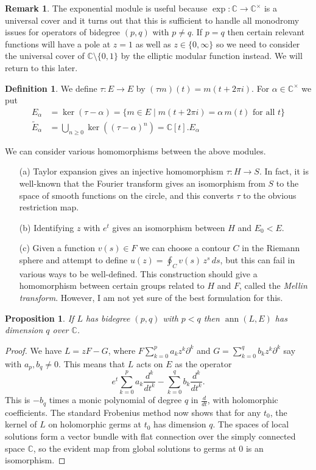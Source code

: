 \documentclass{amsart}
\newcommand{\ann}       {\operatorname{ann}}
\newcommand{\C}         {{\mathbb{C}}}
\newcommand{\al}        {\alpha}
\newcommand{\sm}        {\setminus}
\newcommand{\st}        {\;|\;}
\newcommand{\tE}	{\widetilde{E}}
\newcommand{\tm}        {\times}
\renewcommand{\:}{\colon}
\newtheorem{proposition}[theorem]{Proposition}
\theoremstyle{definition}
\newtheorem{remark}[theorem]{Remark}
\newtheorem{definition}[theorem]{Definition}
\begin{document}
\begin{remark}
 The exponential module is useful because $\exp\:\C\to\C^\tm$ is a
 universal cover and it turns out that this is sufficient to handle
 all monodromy issues for operators of bidegree $(p,q)$ with
 $p\neq q$.  If $p=q$ then certain relevant functions will have a pole
 at $z=1$ as well as $z\in\{0,\infty\}$ so we need to consider the
 universal cover of $\C\sm\{0,1\}$ by the elliptic modular function
 instead.  We will return to this later.
\end{remark}

\begin{definition}
 We define $\tau\:E\to E$ by $(\tau m)(t)=m(t+2\pi i)$.  For
 $\al\in\C^\tm$ we put 
 \begin{align*}
  E_\al &= \ker(\tau-\al) =
            \{m\in E\st m(t+2\pi i)=\al\,m(t)\text{ for all } t\}\\
  \tE_\al &= \bigcup_{n\geq 0}\ker((\tau-\al)^n)
           = \C[t].E_\al
 \end{align*}
\end{definition}

We can consider various homomorphisms between the above modules.
\begin{itemize}
 \item[(a)] Taylor expansion gives an injective homomorphism
  $\tau\:H\to S$.  In fact, it is well-known that the Fourier
  transform gives an isomorphism from $S$ to the space of smooth
  functions on the circle, and this converts $\tau$ to the obvious
  restriction map.
 \item[(b)] Identifying $z$ with $e^t$ gives an isomorphism between
  $H$ and $E_0<E$.
 \item[(c)] Given a function $v(s)\in F$ we can choose a contour $C$
  in the Riemann sphere and attempt to define
  $u(z)=\oint_C v(s)\,z^s\,ds$, but this can fail in various ways to
  be well-defined.  This construction should give a homomorphism
  between certain groups related to $H$ and $F$, called the
  \emph{Mellin transform}.  However, I  am not yet sure of the best
  formulation for this.   
\end{itemize}

\begin{proposition}
 If $L$ has bidegree $(p,q)$ with $p<q$ then $\ann(L,E)$ has dimension
 $q$ over $\C$.
\end{proposition}
\begin{proof}
 We have $L=zF-G$, where $F\sum_{k=0}^pa_kz^k\partial^k$ and
 $G=\sum_{k=0}^qb_kz^k\partial^k$ say with $a_p,b_q\neq 0$.  This
 means that $L$ acts on $E$ as the operator
 \[ e^t \sum_{k=0}^p a_k\frac{d^k}{dt^k} - 
              \sum_{k=0}^q b_k\frac{d^k}{dt^k}.
 \]
 This is $-b_q$ times a monic polynomial of degree $q$ in
 $\frac{d}{dt}$, with holomorphic coefficients.  The standard
 Frobenius method now shows that for any $t_0$, the kernel of $L$ on
 holomorphic germs at $t_0$ has dimension $q$.  The spaces of local
 solutions form a vector bundle with flat connection over the simply
 connected space $\C$, so the evident map from global solutions to
 germs at $0$ is an isomorphism.
\end{proof}
\end{document}

